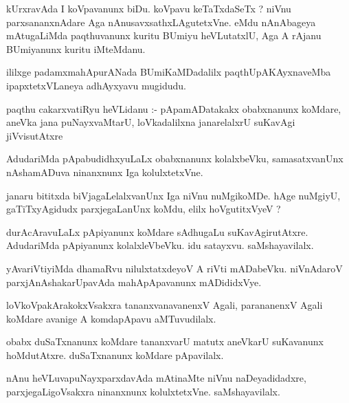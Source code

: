 \documentclass{article}
\begin{document}
\begin{mn}
kUrxravAda I koVpavanunx biDu.  koVpavu keTaTxdaSeTx ? niVnu parxsananxnAdare 
Aga nAnusavxsathxLAgutetxVne. eMdu nAnAbageya mAtugaLiMda paqthuvanunx 
kuritu BUmiyu heVLutatxlU, Aga A rAjanu BUmiyanunx kuritu iMteMdanu.
\end{mn}

\begin{mn}
ililxge padamxmahApurANada BUmiKaMDadalilx paqthUpAKAyxnaveMba ipapxtetxVLaneya adhAyxyavu mugidudu.
\end{mn}




\begin{mn}
paqthu cakarxvatiRyu heVLidanu :-  pApamADatakakx obabxnanunx koMdare, 
aneVka jana puNayxvaMtarU,  loVkadalilxna janarelalxrU suKavAgi jiVvisutAtxre
\end{mn}

\begin{mn}
AdudariMda pApabudidhxyuLaLx obabxnanunx kolalxbeVku,  samasatxvanUnx 
nAshamADuva ninanxnunx Iga kolulxtetxVne.
\end{mn}

\begin{mn}
janaru bititxda biVjagaLelalxvanUnx Iga niVnu nuMgikoMDe. hAge nuMgiyU, 
gaTiTxyAgidudx parxjegaLanUnx koMdu, elilx hoVgutitxVyeV ?
\end{mn}

\begin{mn}
durAcAravuLaLx pApiyanunx koMdare sAdhugaLu suKavAgirutAtxre.  AdudariMda 
pApiyanunx kolalxleVbeVku. idu satayxvu.  saMshayavilalx.
\end{mn}

\begin{mn}
yAvariVtiyiMda dhamaRvu nilulxtatxdeyoV A riVti mADabeVku. niVnAdaroV 
parxjAnAshakarUpavAda mahApApavanunx mADididxVye.
\end{mn}

\begin{mn}
loVkoVpakArakokxVsakxra  tananxvanavanenxV Agali, parananenxV Agali koMdare 
avanige A komdapApavu aMTuvudilalx.
\end{mn}

\begin{mn}
obabx duSaTxnanunx koMdare tananxvarU matutx aneVkarU suKavanunx hoMdutAtxre.  
duSaTxnanunx koMdare pApavilalx.
\end{mn}

\begin{mn}
nAnu heVLuvapuNayxparxdavAda mAtinaMte niVnu naDeyadidadxre, parxjegaLigoVsakxra 
ninanxnunx kolulxtetxVne.  saMshayavilalx.
\end{mn}
\end{document}

